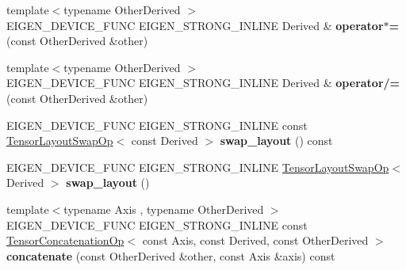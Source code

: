 \begin{DoxyCompactItemize}
\item 
\mbox{\label{class_eigen_1_1_tensor_base_a70d9db7dffed7f8c05919bae69de68f5}} 
{\footnotesize template$<$typename Other\+Derived $>$ }\\E\+I\+G\+E\+N\+\_\+\+D\+E\+V\+I\+C\+E\+\_\+\+F\+U\+NC E\+I\+G\+E\+N\+\_\+\+S\+T\+R\+O\+N\+G\+\_\+\+I\+N\+L\+I\+NE Derived \& {\bfseries operator$\ast$=} (const Other\+Derived \&other)
\item 
\mbox{\label{class_eigen_1_1_tensor_base_af0d8227d12e52a815e1a2e14ee6b8835}} 
{\footnotesize template$<$typename Other\+Derived $>$ }\\E\+I\+G\+E\+N\+\_\+\+D\+E\+V\+I\+C\+E\+\_\+\+F\+U\+NC E\+I\+G\+E\+N\+\_\+\+S\+T\+R\+O\+N\+G\+\_\+\+I\+N\+L\+I\+NE Derived \& {\bfseries operator/=} (const Other\+Derived \&other)
\item 
\mbox{\label{class_eigen_1_1_tensor_base_a342b9da2268a7f7880060eac66949b08}} 
E\+I\+G\+E\+N\+\_\+\+D\+E\+V\+I\+C\+E\+\_\+\+F\+U\+NC E\+I\+G\+E\+N\+\_\+\+S\+T\+R\+O\+N\+G\+\_\+\+I\+N\+L\+I\+NE const \hyperlink{class_eigen_1_1_tensor_layout_swap_op}{Tensor\+Layout\+Swap\+Op}$<$ const Derived $>$ {\bfseries swap\+\_\+layout} () const
\item 
\mbox{\label{class_eigen_1_1_tensor_base_a8c7275270857b89dbcbcab4b6ab07a3c}} 
E\+I\+G\+E\+N\+\_\+\+D\+E\+V\+I\+C\+E\+\_\+\+F\+U\+NC E\+I\+G\+E\+N\+\_\+\+S\+T\+R\+O\+N\+G\+\_\+\+I\+N\+L\+I\+NE \hyperlink{class_eigen_1_1_tensor_layout_swap_op}{Tensor\+Layout\+Swap\+Op}$<$ Derived $>$ {\bfseries swap\+\_\+layout} ()
\item 
\mbox{\label{class_eigen_1_1_tensor_base_a5a55034f8232851cfc18f641b07cf3d5}} 
{\footnotesize template$<$typename Axis , typename Other\+Derived $>$ }\\E\+I\+G\+E\+N\+\_\+\+D\+E\+V\+I\+C\+E\+\_\+\+F\+U\+NC E\+I\+G\+E\+N\+\_\+\+S\+T\+R\+O\+N\+G\+\_\+\+I\+N\+L\+I\+NE const \hyperlink{class_eigen_1_1_tensor_concatenation_op}{Tensor\+Concatenation\+Op}$<$ const Axis, const Derived, const Other\+Derived $>$ {\bfseries concatenate} (const Other\+Derived \&other, const Axis \&axis) const
\item 
\mbox{\label{class_eigen_1_1_tensor_base_a569391e23a84bd853b1dad6142eaed26}} 

\end{DoxyCompactItemize}
